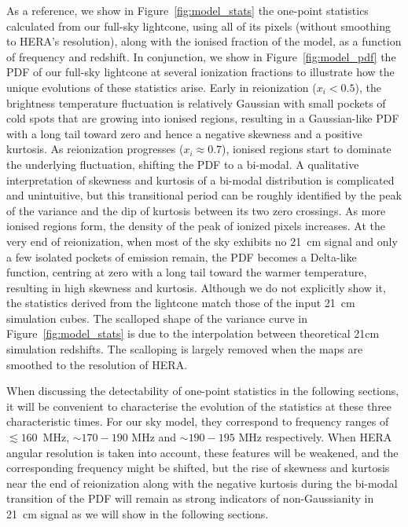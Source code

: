 \documentclass[fleqn,usenatbib]{mnras}
\begin{document}
As a reference, we show in Figure~\ref{fig:model_stats} the one-point statistics calculated from our full-sky lightcone, using all of its pixels (without smoothing to HERA's resolution), along with the ionised fraction of the model, as a function of frequency and redshift. In conjunction, we show in Figure~\ref{fig:model_pdf} the PDF of our full-sky lightcone at several ionization fractions to illustrate how the unique evolutions of these statistics arise. Early in reionization ($x_i<0.5$), the brightness temperature fluctuation is relatively Gaussian with small pockets of cold spots that are growing into ionised regions, resulting in a Gaussian-like PDF with a long tail toward zero and hence a negative skewness and a positive kurtosis. As reionization progresses ($x_i\approx0.7$), ionised regions start to dominate the underlying fluctuation, shifting the PDF to a bi-modal. A qualitative interpretation of skewness and kurtosis of a bi-modal distribution is complicated and unintuitive, but this transitional period can be roughly identified by the peak of the variance and the dip of kurtosis between its two zero crossings. As more ionised regions form, the density of the peak of ionized pixels increases. At the very end of reionization, when most of the sky exhibits no 21~cm signal and only a few isolated pockets of emission remain, the PDF becomes a Delta-like function, centring at zero with a long tail toward the warmer temperature, resulting in high skewness and kurtosis. Although we do not explicitly show it, the statistics derived from the lightcone match those of the input 21~cm simulation cubes. The scalloped shape of the variance curve in Figure~\ref{fig:model_stats} is due to the interpolation between theoretical 21cm simulation redshifts. The scalloping is largely removed when the maps are smoothed to the resolution of HERA.

When discussing the detectability of one-point statistics in the following sections, it will be convenient to characterise the evolution of the statistics at these three characteristic times. For our sky model, they correspond to frequency ranges of $\lesssim160$~MHz, $\sim170-190$ MHz and $\sim190-195$ MHz respectively. When HERA angular resolution is taken into account, these features will be weakened, and the corresponding frequency might be shifted, but the rise of skewness and kurtosis near the end of reionization along with the negative kurtosis during the bi-modal transition of the PDF will remain as strong indicators of non-Gaussianity in 21~cm signal as we will show in the following sections. 
\end{document}
